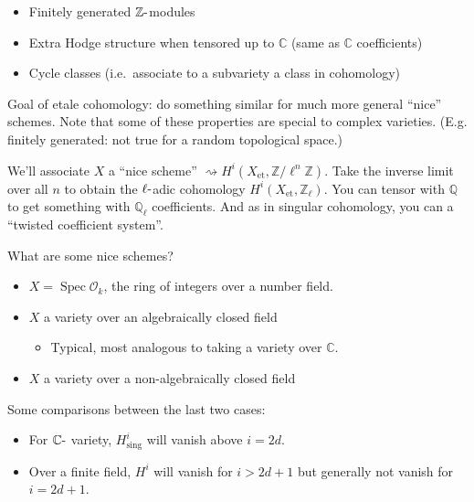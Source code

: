 \begin{itemize}
\tightlist
\item
  Finitely generated \({\mathbb{Z}}{\hbox{-}}\)modules
\item
  Extra Hodge structure when tensored up to \({\mathbb{C}}\) (same as
  \({\mathbb{C}}\) coefficients)
\item
  Cycle classes (i.e.~associate to a subvariety a class in cohomology)
\end{itemize}

Goal of etale cohomology: do something similar for much more general
``nice'' schemes. Note that some of these properties are special to
complex varieties. (E.g. finitely generated: not true for a random
topological space.)

We'll associate \(X\) a ``nice scheme''
\(\rightsquigarrow H^i(X_{\text{et}}, {\mathbb{Z}}/\ell^n{\mathbb{Z}})\).
Take the inverse limit over all \(n\) to obtain the
\(\ell{\hbox{-}}\)adic cohomology
\(H^i(X_{\text{et}}, {\mathbb{Z}}_\ell)\). You can tensor with
\({\mathbb{Q}}\) to get something with \({\mathbb{Q}}_\ell\)
coefficients. And as in singular cohomology, you can a ``twisted
coefficient system''.

\begin{example}[?]

What are some nice schemes?

\begin{itemize}
\tightlist
\item
  \(X = \operatorname{Spec}{\mathcal{O}}_k\), the ring of integers over
  a number field.
\item
  \(X\) a variety over an algebraically closed field

  \begin{itemize}
  \tightlist
  \item
    Typical, most analogous to taking a variety over \({\mathbb{C}}\).
  \end{itemize}
\item
  \(X\) a variety over a non-algebraically closed field
\end{itemize}

\end{example}

Some comparisons between the last two cases:

\begin{itemize}
\tightlist
\item
  For \({\mathbb{C}}{\hbox{-}}\) variety, \(H^i_{\text{sing}}\) will
  vanish above \(i=2d\).
\item
  Over a finite field, \(H^i\) will vanish for \(i>2d+1\) but generally
  not vanish for \(i=2d+1\).
\end{itemize}

